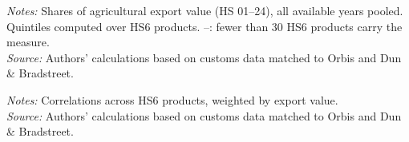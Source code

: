 \documentclass[11pt,a4paper]{article}
\begin{document}
\begin{table}[H]\centering\small%
  \caption{Agriculture: Multinational Share of Export Value, by Quintile of Six Sophistication Measures}%
  \label{tab:six_t_agro}%
  \par\vspace{3pt}%
  \begin{minipage}{0.95\textwidth}\footnotesize %
  \textit{Notes:} Shares of agricultural export value (HS 01--24), all available years pooled. Quintiles computed over HS6 products. --: fewer than 30 HS6 products carry the measure.\\[3pt]%
  \textit{Source:} Authors' calculations based on customs data matched to Orbis and Dun \& Bradstreet.%
  \end{minipage}%
  \end{table}
\begin{table}[H]\centering\small%
  \caption{Agriculture: Correlations between Sophistication Measures}%
  \label{tab:corr_agro}%
  \par\vspace{3pt}%
  \begin{minipage}{0.95\textwidth}\footnotesize %
  \textit{Notes:} Correlations across HS6 products, weighted by export value.\\[3pt]%
  \textit{Source:} Authors' calculations based on customs data matched to Orbis and Dun \& Bradstreet.%
  \end{minipage}%
  \end{table}
\end{document}
